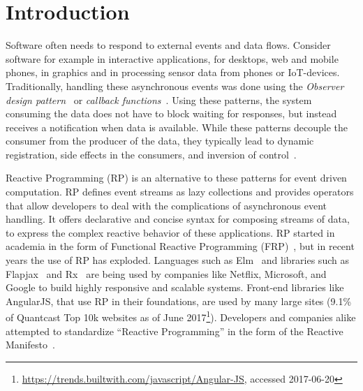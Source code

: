 \section{Introduction}

Software often needs to respond to external events and data flows. Consider software for example in interactive applications, for desktops, web and mobile phones, in graphics and in processing sensor data from phones or IoT-devices. Traditionally, handling these asynchronous events was done using the \emph{Observer design pattern}~\cite{johnson1995design} or \emph{callback functions}~\cite{gallaba2015don}. 
Using these patterns, the system consuming the data does not have to block waiting for responses, but instead receives a notification when data is available. While these patterns decouple the consumer from the producer of the data, they typically lead to dynamic registration, side effects in the consumers, and inversion of control~\cite{salvaneschi2014empirical}.

Reactive Programming (RP) is an alternative to these patterns for event driven computation. 
RP defines event streams as lazy collections and provides operators that allow developers to deal with the complications of asynchronous event handling.
It offers declarative and concise syntax for composing streams of data, to express the complex reactive behavior of these applications.
RP started in academia in the form of Functional Reactive Programming (FRP)~\cite{elliott1997functional,elliott2009push,czaplicki2013asynchronous,maier2010deprecating}, but in recent years the use of RP has exploded. Languages such as Elm~\cite{czaplicki2012elm} and libraries such as Flapjax~\cite{meyerovich2009flapjax} and Rx~\cite{meijer2010subject} are being used by companies like Netflix, Microsoft, and Google to build highly responsive and scalable systems. Front-end libraries like AngularJS, that use RP in their foundations, are used by many large sites (9.1\% of Quantcast Top 10k websites as of June 2017\footnote{
	\url{https://trends.builtwith.com/javascript/Angular-JS}, accessed 2017-06-20
}). Developers and companies alike attempted to standardize ``Reactive Programming'' in the form of the Reactive Manifesto~\cite{boner2014reactive}.


